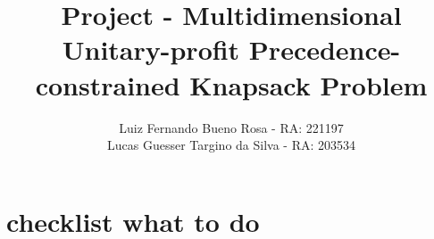 \documentclass{article}
\title{Project -  Multidimensional Unitary-profit Precedence-constrained Knapsack Problem}
\author{
	Luiz Fernando Bueno Rosa - RA: 221197 \\
	Lucas Guesser Targino da Silva - RA: 203534
}
\theoremstyle{definition}
\begin{document}
\maketitle

\section{checklist what to do}











\end{document}
